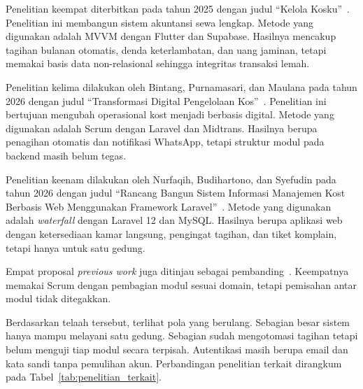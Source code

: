 Penelitian keempat diterbitkan pada tahun 2025 dengan judul ``Kelola Kosku''~\cite{jscr2025}. Penelitian ini membangun sistem akuntansi sewa lengkap. Metode yang digunakan adalah MVVM dengan Flutter dan Supabase. Hasilnya mencakup tagihan bulanan otomatis, denda keterlambatan, dan uang jaminan, tetapi memakai basis data non-relasional sehingga integritas transaksi lemah.

Penelitian kelima dilakukan oleh Bintang, Purnamasari, dan Maulana pada tahun 2026 dengan judul ``Transformasi Digital Pengelolaan Kos''~\cite{bintang2026}. Penelitian ini bertujuan mengubah operasional kost menjadi berbasis digital. Metode yang digunakan adalah Scrum dengan Laravel dan Midtrans. Hasilnya berupa penagihan otomatis dan notifikasi WhatsApp, tetapi struktur modul pada backend masih belum tegas.

Penelitian keenam dilakukan oleh Nurfaqih, Budihartono, dan Syefudin pada tahun 2026 dengan judul ``Rancang Bangun Sistem Informasi Manajemen Kost Berbasis Web Menggunakan Framework Laravel''~\cite{nurfaqih2026}. Metode yang digunakan adalah \textit{waterfall} dengan Laravel 12 dan MySQL. Hasilnya berupa aplikasi web dengan ketersediaan kamar langsung, pengingat tagihan, dan tiket komplain, tetapi hanya untuk satu gedung.

Empat proposal \textit{previous work} juga ditinjau sebagai pembanding~\cite{rasyidatur2025,roihanah2025,rizal2025,bagus2025}. Keempatnya memakai Scrum dengan pembagian modul sesuai domain, tetapi pemisahan antar modul tidak ditegakkan.

Berdasarkan telaah tersebut, terlihat pola yang berulang. Sebagian besar sistem hanya mampu melayani satu gedung. Sebagian sudah mengotomasi tagihan tetapi belum menguji tiap modul secara terpisah. Autentikasi masih berupa email dan kata sandi tanpa pemulihan akun. Perbandingan penelitian terkait dirangkum pada Tabel~\ref{tab:penelitian_terkait}.

